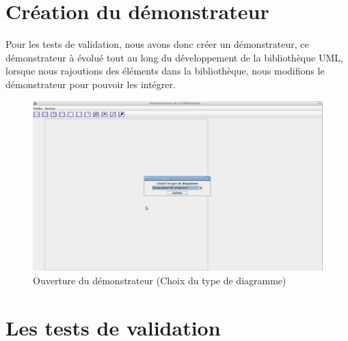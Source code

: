\documentclass[12pt,a4paper,openany]{report}
\begin{document}
	\section{Création du démonstrateur}
	Pour les tests de validation, nous avons donc créer un démonstrateur, ce démonstrateur à évolué tout au long du développement de la bibliothèque UML, 
	lorsque nous rajoutions des éléments dans la bibliothèque, nous modifions le démonstrateur pour pouvoir les intégrer.
		\begin{figure}[H]
			\centering
			\includegraphics[width=18cm]{choixDiagramme.jpg}
			\caption{Ouverture du démonstrateur (Choix du type de diagramme)}
		\end{figure}
	\newpage
	\section{Les tests de validation}
\end{document}
